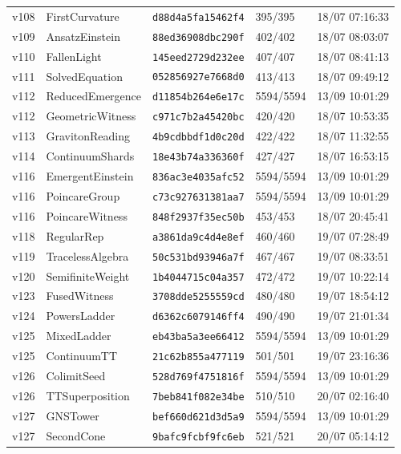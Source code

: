 \documentclass[11pt]{article}
\theoremstyle{definition}\newtheorem{deriv}{Derivation}
\begin{document}
{\begin{longtable}{@{}lllll@{}}
v108 & FirstCurvature & \texttt{d88d4a5fa15462f4} & 395/395 & 18/07 07:16:33 \\
v109 & AnsatzEinstein & \texttt{88ed36908dbc290f} & 402/402 & 18/07 08:03:07 \\
v110 & FallenLight & \texttt{145eed2729d232ee} & 407/407 & 18/07 08:41:13 \\
v111 & SolvedEquation & \texttt{052856927e7668d0} & 413/413 & 18/07 09:49:12 \\
v112 & ReducedEmergence & \texttt{d11854b264e6e17c} & 5594/5594 & 13/09 10:01:29 \\
v112 & GeometricWitness & \texttt{c971c7b2a45420bc} & 420/420 & 18/07 10:53:35 \\
v113 & GravitonReading & \texttt{4b9cdbbdf1d0c20d} & 422/422 & 18/07 11:32:55 \\
v114 & ContinuumShards & \texttt{18e43b74a336360f} & 427/427 & 18/07 16:53:15 \\
v116 & EmergentEinstein & \texttt{836ac3e4035afc52} & 5594/5594 & 13/09 10:01:29 \\
v116 & PoincareGroup & \texttt{c73c927631381aa7} & 5594/5594 & 13/09 10:01:29 \\
v116 & PoincareWitness & \texttt{848f2937f35ec50b} & 453/453 & 18/07 20:45:41 \\
v118 & RegularRep & \texttt{a3861da9c4d4e8ef} & 460/460 & 19/07 07:28:49 \\
v119 & TracelessAlgebra & \texttt{50c531bd93946a7f} & 467/467 & 19/07 08:33:51 \\
v120 & SemifiniteWeight & \texttt{1b4044715c04a357} & 472/472 & 19/07 10:22:14 \\
v123 & FusedWitness & \texttt{3708dde5255559cd} & 480/480 & 19/07 18:54:12 \\
v124 & PowersLadder & \texttt{d6362c6079146ff4} & 490/490 & 19/07 21:01:34 \\
v125 & MixedLadder & \texttt{eb43ba5a3ee66412} & 5594/5594 & 13/09 10:01:29 \\
v125 & ContinuumTT & \texttt{21c62b855a477119} & 501/501 & 19/07 23:16:36 \\
v126 & ColimitSeed & \texttt{528d769f4751816f} & 5594/5594 & 13/09 10:01:29 \\
v126 & TTSuperposition & \texttt{7beb841f082e34be} & 510/510 & 20/07 02:16:40 \\
v127 & GNSTower & \texttt{bef660d621d3d5a9} & 5594/5594 & 13/09 10:01:29 \\
v127 & SecondCone & \texttt{9bafc9fcbf9fc6eb} & 521/521 & 20/07 05:14:12 \\

\end{longtable}}
\end{document}
